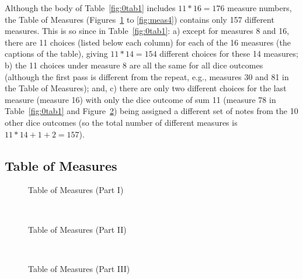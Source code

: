 \documentclass[letterpaper,x11names,svgnames,10pt]{article}
\begin{document}
{Although the body of Table~\ref{fig:0tab1} includes $11*16 = 176$ measure numbers, the Table of Measures (Figures~\ref{fig:meas1} to \ref{fig:meas4}) contains only 157 different measures.  This is so since in Table~\ref{fig:0tab1}: a) except for measures 8 and 16, there are 11 choices (listed below each column) for each of the 16 measures (the captions of the table), giving $11*14=154$ different choices for these 14 measures; b) the 11 choices under measure 8 are all the same for all dice outcomes (although the first pass is different from the repeat, e.g., measures 30 and 81 in the Table of Measures); and, c) there are only two different choices for the last measure (measure 16) with only the dice outcome of sum 11 (measure 78 in Table~\ref{fig:0tab1} and Figure~\ref{fig:meas2}) being assigned a different set of notes from the 10 other dice outcomes (so the total number of different measures is $11*14 + 1 + 2 = 157$).

\nopagebreak[4]
\subsection{Table of Measures}

\begin{figure}[H]
	\centering
	\def\svgwidth{0.975\columnwidth}
	
	\caption{Table of Measures (Part I)}
	\label{fig:meas1}
\end{figure}

\newpage
${}_{}$\\
\vspace{0.10in}
\begin{figure}[H]
	\centering
	\def\svgwidth{0.975\columnwidth}
	
	\caption{Table of Measures (Part II)}
	\label{fig:meas2}
\end{figure}

\newpage
${}_{}$\\
\vspace{0.10in}
\begin{figure}[H]
	\centering
	\def\svgwidth{0.975\columnwidth}
	
	\caption{Table of Measures (Part III)}
	\label{fig:meas3}
\end{figure}

}
\end{document}
